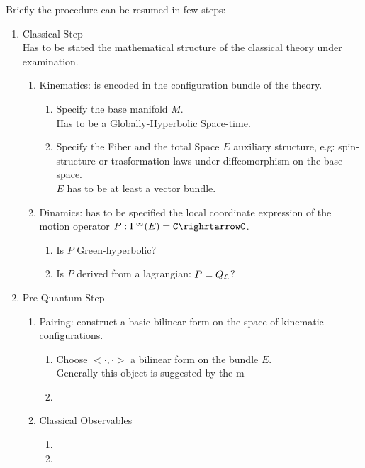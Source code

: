 \documentclass[Main]{subfiles}
\begin{document}
	Briefly the procedure can be resumed in few steps:
 	\begin{enumerate}
   		\item Classical Step\\
   			Has to be stated the mathematical structure of the classical theory under examination.
   			\begin{enumerate}
   				\item Kinematics: is encoded in the configuration bundle of the theory.
   					\begin{enumerate}
   						\item Specify the base manifold $M$. \\Has to be a Globally-Hyperbolic Space-time.
   						\item Specify the Fiber and the total Space $E$ auxiliary structure, e.g: spin-structure or trasformation laws under diffeomorphism on the base space.\\$E$ has to be at least a vector bundle.
   					\end{enumerate}
   			
   				\item Dinamics: has to be specified the local coordinate expression of the motion operator $P: \Gamma^\infty(E)=\Conf\righrtarrow\Conf$.
   				   	\begin{enumerate}
   						\item Is $P$ Green-hyperbolic?
   						\item Is $P$ derived from a lagrangian: $P=Q_{\mathcal{L}}$? 
   					\end{enumerate}
   			\end{enumerate}
   			
   		\item Pre-Quantum Step
   		   	\begin{enumerate}
   				\item Pairing: construct a basic bilinear form on the space of kinematic configurations.
   					\begin{enumerate}
   						\item Choose $<\cdot,\cdot>$ a bilinear form on the bundle $E$.\\ Generally this object is suggested by the m
   						\item
   					\end{enumerate}
   					
   				\item Classical Observables
   				   	\begin{enumerate}
   						\item
   						\item
   					\end{enumerate}
   				 

\end{enumerate}
\end{enumerate}
\end{document}
